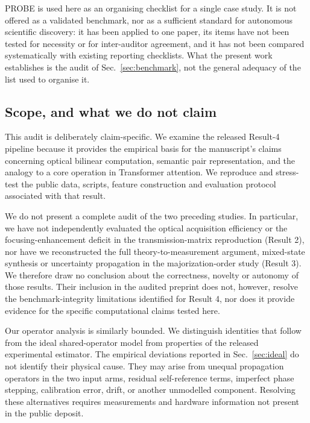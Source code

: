 \documentclass[11pt,a4paper]{article}
\begin{document}
PROBE is used here as an organising checklist for a single case study. It is
not offered as a validated benchmark, nor as a sufficient standard for
autonomous scientific discovery: it has been applied to one paper, its items
have not been tested for necessity or for inter-auditor agreement, and it has
not been compared systematically with existing reporting checklists. What the
present work establishes is the audit of Sec.~\ref{sec:benchmark}, not the
general adequacy of the list used to organise it.

\subsection{Scope, and what we do not claim}
\label{sec:scope}\label{sec:caveats}


This audit is deliberately claim-specific. We examine the released Result-4
pipeline because it provides the empirical basis for the manuscript's claims
concerning optical bilinear computation, semantic pair representation, and the
analogy to a core operation in Transformer attention. We reproduce and
stress-test the public data, scripts, feature construction and evaluation
protocol associated with that result.

We do not present a complete audit of the two preceding studies. In
particular, we have not independently evaluated the optical acquisition
efficiency or the focusing-enhancement deficit in the transmission-matrix
reproduction (Result 2), nor have we reconstructed the full
theory-to-measurement argument, mixed-state synthesis or uncertainty
propagation in the majorization-order study (Result 3). We therefore draw no
conclusion about the correctness, novelty or autonomy of those results. Their
inclusion in the audited preprint does not, however, resolve the
benchmark-integrity limitations identified for Result 4, nor does it provide
evidence for the specific computational claims tested here.

Our operator analysis is similarly bounded. We distinguish identities that
follow from the ideal shared-operator model from properties of the released
experimental estimator. The empirical deviations reported in
Sec.~\ref{sec:ideal} do not identify their physical cause. They may arise from
unequal propagation operators in the two input arms, residual self-reference
terms, imperfect phase stepping, calibration error, drift, or another
unmodelled component. Resolving these alternatives requires measurements and
hardware information not present in the public deposit.
\end{document}
